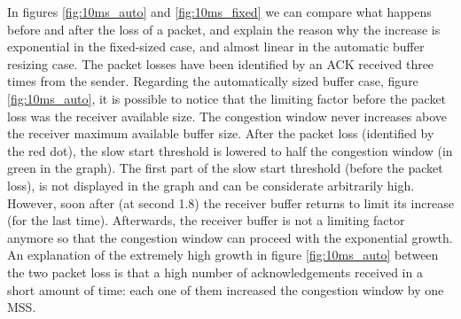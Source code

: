 \documentclass[a4paper,10pt]{article}
\begin{document}
In figures \ref{fig:10ms_auto} and \ref{fig:10ms_fixed} we can compare what happens before and after the loss of a packet, and explain the reason why the increase is exponential in the fixed-sized case, and almost linear in the automatic buffer resizing case. 
The packet losses have been identified by an ACK received three times from the sender. 
Regarding the automatically sized buffer case, figure \ref{fig:10ms_auto}, it is possible to notice that the limiting factor before the packet loss was the receiver available size. The congestion window never increases above the receiver maximum available buffer size. After the packet loss (identified by the red dot), the slow start threshold is lowered to half the congestion window (in green in the graph). The first part of the slow start threshold (before the packet loss), is not displayed in the graph and can be considerate arbitrarily high. However, soon after (at second 1.8) the receiver buffer returns to limit its increase (for the last time). Afterwards, the receiver buffer is not a limiting factor anymore so that the congestion window can proceed with the exponential growth.
An explanation of the extremely high growth in figure \ref{fig:10ms_auto} between the two packet loss is that a high number of acknowledgements received in a short amount of time: each one of them increased the congestion window by one MSS.
\end{document}
